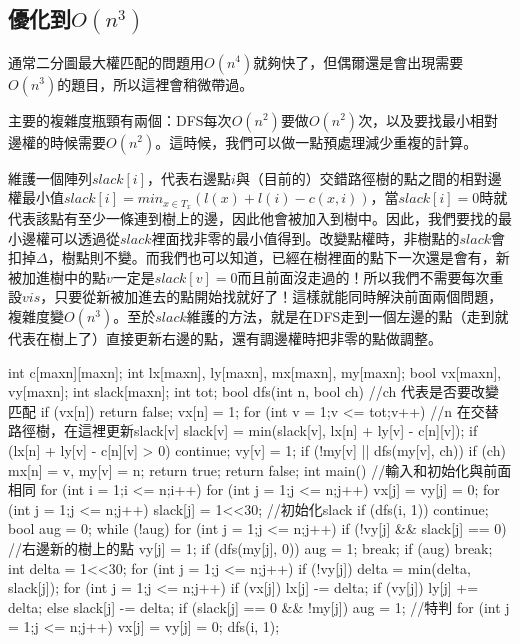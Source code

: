 \documentclass[main.tex]{subfiles}
\begin{document}
\subsection{優化到$O(n^3)$}
通常二分圖最大權匹配的問題用$O(n^4)$就夠快了，但偶爾還是會出現需要$O(n^3)$的題目，所以這裡會稍微帶過。
\par 主要的複雜度瓶頸有兩個：DFS每次$O(n^2)$要做$O(n^2)$次，以及要找最小相對邊權的時候需要$O(n^2)$。這時候，我們可以做一點預處理減少重複的計算。
\par 維護一個陣列$slack[i]$，代表右邊點$i$與（目前的）交錯路徑樹的點之間的相對邊權最小值\(slack[i] = min_{x \in T_x}(l(x) + l(i) - c(x, i))\)，當$slack[i] = 0$時就代表該點有至少一條連到樹上的邊，因此他會被加入到樹中。因此，我們要找的最小邊權可以透過從\(slack\)裡面找非零的最小值得到。改變點權時，非樹點的\(slack\)會扣掉\(\Delta\)，樹點則不變。而我們也可以知道，已經在樹裡面的點下一次還是會有，新被加進樹中的點$v$一定是$slack[v] = 0$而且前面沒走過的！所以我們不需要每次重設$vis$，只要從新被加進去的點開始找就好了！這樣就能同時解決前面兩個問題，複雜度變$O(n^3)$。至於$slack$維護的方法，就是在DFS走到一個左邊的點（走到就代表在樹上了）直接更新右邊的點，還有調邊權時把非零的點做調整。
\begin{C++}
int c[maxn][maxn];
int lx[maxn], ly[maxn], mx[maxn], my[maxn];
bool vx[maxn], vy[maxn];
int slack[maxn];
int tot;
bool dfs(int n, bool ch) { //ch 代表是否要改變匹配
    if (vx[n]) return false;
    vx[n] = 1;
    for (int v = 1;v <= tot;v++) {
        //n 在交替路徑樹，在這裡更新slack[v]
        slack[v] = min(slack[v], lx[n] + ly[v] - c[n][v]);
        if (lx[n] + ly[v] - c[n][v] > 0) continue;
        vy[v] = 1;
        if (!my[v] || dfs(my[v], ch)) {
            if (ch) mx[n] = v, my[v] = n;
            return true;
        }
    }
    return false;
}
int main() {
    //輸入和初始化與前面相同
    for (int i = 1;i <= n;i++) {
        for (int j = 1;j <= n;j++) vx[j] = vy[j] = 0;
        for (int j = 1;j <= n;j++) slack[j] = 1<<30; //初始化slack
		if (dfs(i, 1)) continue;
        bool aug = 0;
        while (!aug) {
            for (int j = 1;j <= n;j++) {
                if (!vy[j] && slack[j] == 0) { //右邊新的樹上的點
					vy[j] = 1;
					if (dfs(my[j], 0)) {
						aug = 1;
						break;
					}
                }
            }
            if (aug) break;
            int delta = 1<<30;
            for (int j = 1;j <= n;j++) {
                if (!vy[j]) delta = min(delta, slack[j]);
            }
            for (int j = 1;j <= n;j++) {
                if (vx[j]) lx[j] -= delta;
                if (vy[j]) ly[j] += delta;
                else {
                    slack[j] -= delta;
                    if (slack[j] == 0 && !my[j]) aug = 1; //特判
                }
            }
        }
        for (int j = 1;j <= n;j++) vx[j] = vy[j] = 0;
        dfs(i, 1);
    }
}    


\end{C++}
\end{document}
